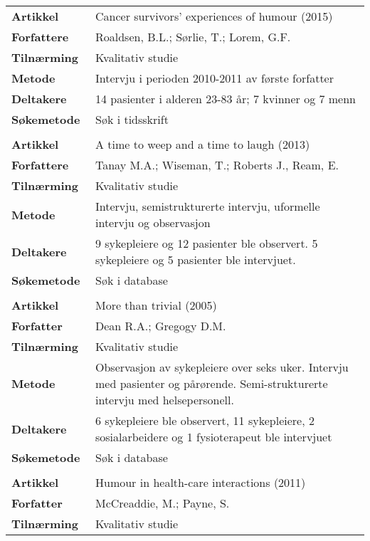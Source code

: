 \begin{table}
  \begin{tabularx}{\textwidth}{lX}
    \textbf{Artikkel} & Cancer survivors’ experiences of humour (2015) \\
    \textbf{Forfattere} & Roaldsen, B.L.; S{\o}rlie, T.; Lorem, G.F. \\
    \textbf{Tilnærming} & Kvalitativ studie \\
    \textbf{Metode} & Intervju i perioden 2010-2011 av første forfatter \\
    \textbf{Deltakere} & 14 pasienter i alderen 23-83 år; 7 kvinner og 7 menn  \\
    \textbf{Søkemetode} & Søk i tidsskrift \\
    \\
    \textbf{Artikkel} & A time to weep and a time to laugh (2013) \\
    \textbf{Forfattere} & Tanay M.A.; Wiseman, T.; Roberts J., Ream, E. \\
    \textbf{Tilnærming} & Kvalitativ studie \\
    \textbf{Metode} & Intervju, semistrukturerte intervju, uformelle intervju
    og observasjon \\
    \textbf{Deltakere} & 9 sykepleiere og 12 pasienter ble observert. 5
    sykepleiere og 5 pasienter ble intervjuet. \\
    \textbf{Søkemetode} & Søk i database \\
    \\
    \textbf{Artikkel} & More than trivial (2005) \\
    \textbf{Forfatter} & Dean R.A.; Gregogy D.M. \\
    \textbf{Tilnærming} & Kvalitativ studie \\
    \textbf{Metode} & Observasjon av sykepleiere over seks uker. Intervju med
    pasienter og pårørende. Semi-strukturerte intervju med helsepersonell. \\
    \textbf{Deltakere} & 6 sykepleiere ble observert, 11 sykepleiere, 2
    sosialarbeidere og 1 fysioterapeut ble intervjuet \\
    \textbf{Søkemetode} & Søk i database \\
    \\
    \textbf{Artikkel} & Humour in health-care interactions (2011) \\
    \textbf{Forfatter} & McCreaddie, M.; Payne, S. \\
    \textbf{Tilnærming} & Kvalitativ studie \\

\end{tabularx}
\end{table}

